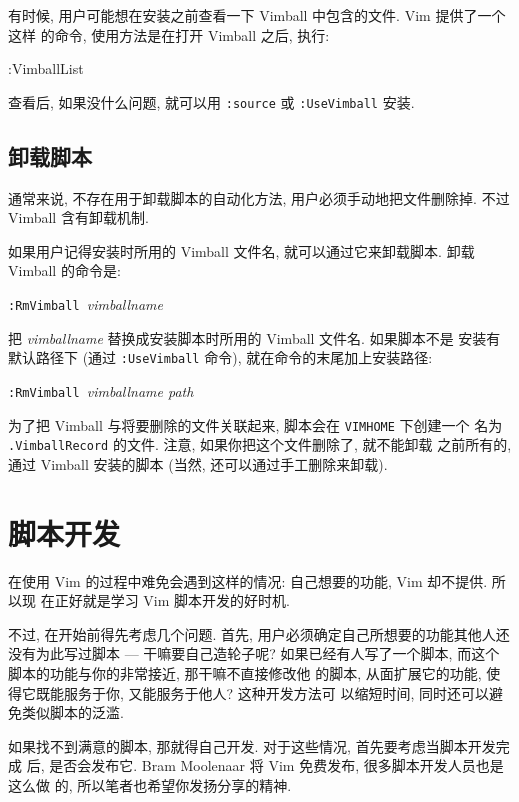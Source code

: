 有时候, 用户可能想在安装之前查看一下 Vimball 中包含的文件. Vim 提供了一个这样
的命令, 使用方法是在打开 Vimball 之后, 执行:
\begin{vimcode}
:VimballList
\end{vimcode}

查看后, 如果没什么问题, 就可以用 \texttt{:source} 或 \texttt{:UseVimball}
安装.

\subsection{卸载脚本}
\label{subsec:uninstalling_scripts}

通常来说, 不存在用于卸载脚本的自动化方法, 用户必须手动地把文件删除掉. 不过
Vimball 含有卸载机制.

如果用户记得安装时所用的 Vimball 文件名, 就可以通过它来卸载脚本. 卸载 Vimball
的命令是:
\begin{vimcmdform}
\texttt{:RmVimball }\textit{vimballname}
\end{vimcmdform}
把 \textit{vimballname} 替换成安装脚本时所用的 Vimball 文件名. 如果脚本不是
安装有默认路径下 (通过 \texttt{:UseVimball} 命令), 就在命令的末尾加上安装路径:
\begin{vimcmdform}
\texttt{:RmVimball }\textit{vimballname path}
\end{vimcmdform}

为了把 Vimball 与将要删除的文件关联起来, 脚本会在 \texttt{VIMHOME} 下创建一个
名为 \texttt{.VimballRecord} 的文件. 注意, 如果你把这个文件删除了, 就不能卸载
之前所有的, 通过 Vimball 安装的脚本 (当然, 还可以通过手工删除来卸载).

\section{脚本开发}
\label{sec:script_development}

在使用 Vim 的过程中难免会遇到这样的情况: 自己想要的功能, Vim 却不提供. 所以现
在正好就是学习 Vim 脚本开发的好时机.

不过, 在开始前得先考虑几个问题.
首先, 用户必须确定自己所想要的功能其他人还没有为此写过脚本 --- 干嘛要自己造轮子呢?
如果已经有人写了一个脚本, 而这个脚本的功能与你的非常接近, 那干嘛不直接修改他
的脚本, 从面扩展它的功能, 使得它既能服务于你, 又能服务于他人? 这种开发方法可
以缩短时间, 同时还可以避免类似脚本的泛滥.

如果找不到满意的脚本, 那就得自己开发. 对于这些情况, 首先要考虑当脚本开发完成
后, 是否会发布它. Bram Moolenaar 将 Vim 免费发布, 很多脚本开发人员也是这么做
的, 所以笔者也希望你发扬分享的精神.

